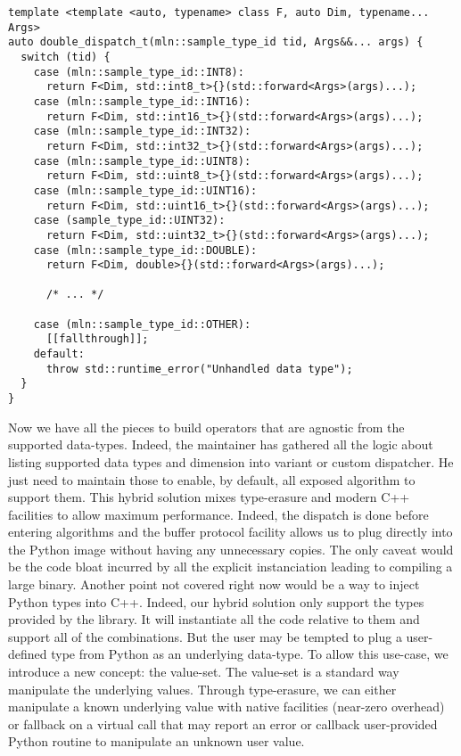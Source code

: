 \begin{verbatim}
template <template <auto, typename> class F, auto Dim, typename... Args>
auto double_dispatch_t(mln::sample_type_id tid, Args&&... args) {
  switch (tid) {
    case (mln::sample_type_id::INT8):
      return F<Dim, std::int8_t>{}(std::forward<Args>(args)...);
    case (mln::sample_type_id::INT16):
      return F<Dim, std::int16_t>{}(std::forward<Args>(args)...);
    case (mln::sample_type_id::INT32):
      return F<Dim, std::int32_t>{}(std::forward<Args>(args)...);
    case (mln::sample_type_id::UINT8):
      return F<Dim, std::uint8_t>{}(std::forward<Args>(args)...);
    case (mln::sample_type_id::UINT16):
      return F<Dim, std::uint16_t>{}(std::forward<Args>(args)...);
    case (sample_type_id::UINT32):
      return F<Dim, std::uint32_t>{}(std::forward<Args>(args)...);
    case (mln::sample_type_id::DOUBLE):
      return F<Dim, double>{}(std::forward<Args>(args)...);

      /* ... */

    case (mln::sample_type_id::OTHER):
      [[fallthrough]];
    default:
      throw std::runtime_error("Unhandled data type");
  }
}
\end{verbatim}

Now we have all the pieces to build operators that are agnostic from the supported data-types. Indeed, the maintainer
has gathered all the logic about listing supported data types and dimension into variant or custom dispatcher. He just
need to maintain those to enable, by default, all exposed algorithm to support them. This hybrid solution mixes
type-erasure and modern C++ facilities to allow maximum performance. Indeed, the dispatch is done before entering
algorithms and the buffer protocol facility allows us to plug directly into the Python image without having any
unnecessary copies. The only caveat would be the code bloat incurred by all the explicit instanciation leading to
compiling a large binary. Another point not covered right now would be a way to inject Python types into C++. Indeed,
our hybrid solution only support the types provided by the library. It will instantiate all the code relative to them
and support all of the combinations. But the user may be tempted to plug a user-defined type from Python as an
underlying data-type. To allow this use-case, we introduce a new concept: the value-set. The value-set is a standard way
manipulate the underlying values. Through type-erasure, we can either manipulate a known underlying value with native
facilities (near-zero overhead) or fallback on a virtual call that may report an error or callback user-provided Python
routine to manipulate an unknown user value.

